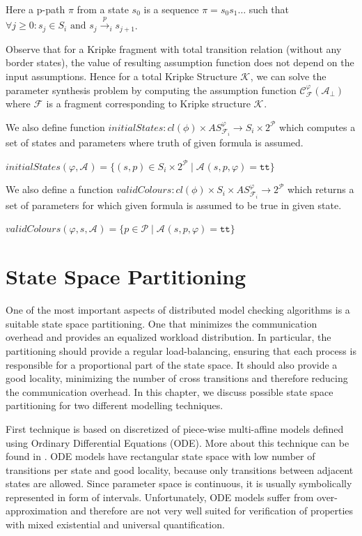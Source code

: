 \documentclass[12pt,oneside]{fithesis2}
\newcommand{\as}[1][]{\ensuremath{\mathcal{A}_{#1}}}
\newcommand{\asemt}{\as[\perp]}
\newcommand{\ASphi}{\ensuremath{AS_{\kf{i}{}}^\varphi}}
\newcommand{\true}{\ensuremath{\texttt{tt}}}
\newcommand{\ks}[1][]{\ensuremath{\mathcal{K}_{#1}}}
\newcommand{\kf}[2]{\ensuremath{\mathcal{F}^{#2}_{#1}}}
\newcommand{\trans}[1]{\stackrel{#1}{\rightarrow}}
\newcommand{\params}{\mathcal{P}}
\begin{document}
			Here a p-path $\pi$ from a state $s_0$ is a sequence $\pi = s_0s_1\ldots$ such that ${\forall j \geq 0} : s_j \in S_i \mbox{ and } s_j \trans{p}_i s_{j+1} $.
		
			Observe that for a Kripke fragment with total transition relation (without any border states), the value of resulting assumption function does not depend on the input assumptions. Hence for a total Kripke Structure $\ks$, we can solve the parameter synthesis problem by computing the assumption function $\mathcal{C}^{\varphi}_{\mathcal{F}}(\asemt)$ where $\kf{}{}$ is a fragment corresponding to Kripke structure $\ks$.
		
			We also define function $initialStates : cl(\phi) \times \ASphi \rightarrow S_i \times 2^\mathcal{P}$ which computes a set of states and parameters where truth of given formula is assumed.
			
			\begin{center}
				$initialStates(\varphi, \as) = \{ (s, p) \in S_i \times 2^\params \mid \as(s, p, \varphi) = \true \} $
			\end{center}			

		   We also define a function $validColours : cl(\phi) \times S_i \times \ASphi \rightarrow 2^\mathcal{P}	$ which returns a set of parameters for which given formula is assumed to be true in given state. 
			
			\begin{center}
				$validColours(\varphi, s, \as) = \{ p \in \params \mid \as(s, p, \varphi) = \true \}$
			\end{center}			

	\chapter{State Space Partitioning}
		\label{chap:partitioning}


			One of the most important aspects of distributed model checking algorithms is a suitable state space partitioning. One that minimizes the communication overhead and provides an equalized workload distribution. In particular, the partitioning should provide a regular load-balancing, ensuring that each process is responsible for a proportional part of the state space. It should also provide a good locality, minimizing the number of cross transitions and therefore reducing the communication overhead. In this chapter, we discuss possible state space partitioning for two different modelling techniques.
				
			First technique is based on discretized of piece-wise multi-affine models defined using Ordinary Differential Equations (ODE). More about this technique can be found in \cite{IFAC}. ODE models have rectangular state space with low number of transitions per state and good locality, because only transitions between adjacent states are allowed. Since parameter space is continuous, it is usually symbolically represented in form of intervals. Unfortunately, ODE models suffer from over-approximation and therefore are not very well suited for verification of properties with mixed existential and universal quantification.
	
\end{document}
